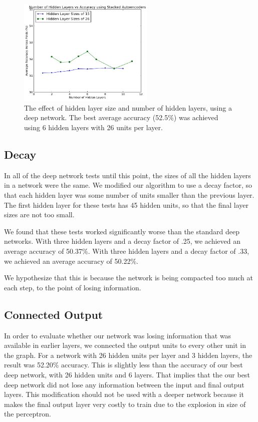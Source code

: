 \documentclass[letterpaper,twocolumn,12pt]{article}
\begin{document}
\begin{figure}[ht!]
\centering
\includegraphics[width=65mm]{results/deep/numLayers/deep_numLayers.png}
\caption{The effect of hidden layer size and number of hidden layers, using a deep network. The best average accuracy (52.5\%) was achieved using 6 hidden layers with 26 units per layer.}
\label{fig:deep_num_hidden_layers}
\end{figure}

\subsection{Decay}
In all of the deep network tests until this point, the sizes of all the hidden layers in a network were the same.
We modified our algorithm to use a decay factor, so that each hidden layer was some number of units smaller than the previous layer.
The first hidden layer for these tests has 45 hidden units, so that the final layer sizes are not too small.

We found that these tests worked significantly worse than the standard deep networks.
With three hidden layers and a decay factor of .25, we achieved an average accuracy of 50.37\%.
With three hidden layers and a decay factor of .33, we achieved an average accuracy of 50.22\%.

We hypothesize that this is because the network is being compacted too much at each step, to the point of losing information.

\subsection{Connected Output}
In order to evaluate whether our network was losing information that was available in earlier layers, we connected the output units to every other unit in the graph.
For a network with 26 hidden units per layer and 3 hidden layers, the result was 52.20\% accuracy.
This is slightly less than the accuracy of our best deep network, with 26 hidden units and 6 layers.
That implies that the our best deep network did not lose any information between the input and final output layers.
This modification should not be used with a deeper network because it makes the final output layer very costly to train due to the explosion in size of the perceptron.
\end{document}

